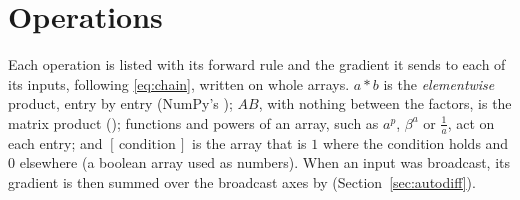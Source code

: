 \section{Operations}
\label{sec:ops}

Each operation is listed with its forward rule and the gradient it sends to each of its inputs,
following \eqref{eq:chain}, written on whole arrays. $a \ast b$ is the \emph{elementwise} product,
entry by entry (NumPy's ); $AB$, with nothing between the factors, is the matrix
product (); functions and powers of an array, such as $a^{p}$, $\beta^{a}$ or
$\tfrac{1}{a}$, act on each entry; and $[\,\text{condition}\,]$ is the array that is $1$ where the
condition holds and $0$ elsewhere (a boolean array used as numbers). When an input was broadcast,
its gradient is then summed over the broadcast axes by 
(Section~\ref{sec:autodiff}).

